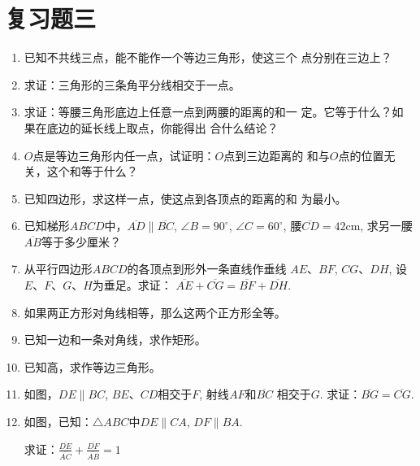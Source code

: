 \section*{复习题三}
\begin{enumerate}
    \item 已知不共线三点，能不能作一个等边三角形，使这三个
    点分别在三边上？
    \item 求证：三角形的三条角平分线相交于一点。
    \item 求证：等腰三角形底边上任意一点到两腰的距离的和一
    定。它等于什么？如果在底边的延长线上取点，你能得出
    合什么结论？
    \item $O$点是等边三角形内任一点，试证明：$O$点到三边距离的
    和与$O$点的位置无关，这个和等于什么？
    \item 已知四边形，求这样一点，使这点到各顶点的距离的和
    为最小。
    \item 已知梯形$ABCD$中，$\overline{AD}\parallel\overline{BC}$, $\angle B=90^{\circ}$, 
    $\angle C=60^{\circ}$, 腰$\overline{CD}=42$cm, 求另一腰$\overline{AB}$等于多少厘米？
    \item 从平行四边形$ABCD$的各顶点到形外一条直线作垂线
    $AE$、$BF$, $CG$、$DH$, 设$E$、$F$、$G$、$H$为垂足。求证：
    $\overline{AE}+\overline{CG}=\overline{BF}+\overline{DH}$.
    \item 如果两正方形对角线相等，那么这两个正方形全等。
\item 已知一边和一条对角线，求作矩形。
\item 已知高，求作等边三角形。
\item 如图，$DE\parallel BC$, $BE$、$CD$相交于$F$, 射线$AF$和$\overline{BC}$
相交于$G$. 求证：$\overline{BG}=\overline{CG}$.
\item 如图，已知：$\triangle ABC$中$DE\parallel CA$, $DF\parallel BA$.

求证：$\frac{\overline{DE}}{\overline{AC}}+\frac{\overline{DF}}{\overline{AB}}=1$


\end{enumerate}
